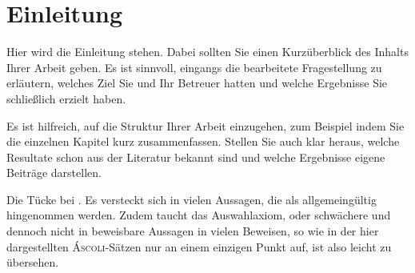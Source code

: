 \section*{Einleitung}

Hier wird die Einleitung stehen. Dabei sollten Sie einen Kurzüberblick des Inhalts Ihrer Arbeit geben. Es ist sinnvoll, eingangs die bearbeitete Fragestellung zu erläutern, welches Ziel Sie und Ihr Betreuer hatten und welche Ergebnisse Sie schließlich erzielt haben.

Es ist hilfreich, auf die Struktur Ihrer Arbeit einzugehen, zum Beispiel indem Sie die einzelnen Kapitel kurz zusammenfassen. Stellen Sie auch klar heraus, welche Resultate schon aus der Literatur bekannt sind und welche Ergebnisse eigene Beiträge darstellen.

Die Tücke bei \AC. Es versteckt sich in vielen Aussagen, die als allgemeingültig hingenommen werden. Zudem taucht das Auswahlaxiom, oder schwächere und dennoch nicht in \ZF beweisbare Aussagen in vielen Beweisen, so wie in der hier dargestellten \textsc{Áscoli}-Sätzen nur an einem einzigen Punkt auf, ist also leicht zu übersehen.

